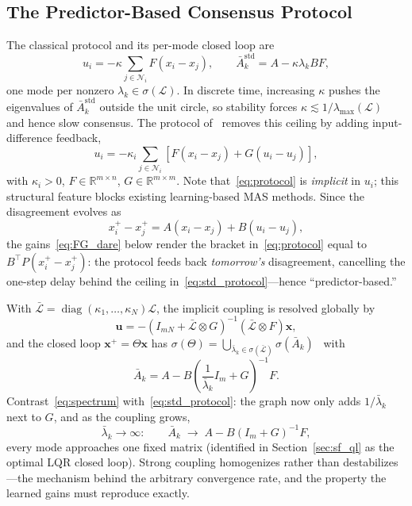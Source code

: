 \documentclass[final,5p,times]{elsarticle}
\theoremstyle{plain}
\theoremstyle{definition}
\theoremstyle{remark}
\DeclareMathOperator{\diag}{diag}
\newcommand{\R}{\mathbb{R}}
\newcommand{\bx}{\boldsymbol{x}}
\newcommand{\bu}{\boldsymbol{u}}
\begin{document}
\subsection{The Predictor-Based Consensus Protocol}
\label{subsec:protocol}
The classical protocol and its per-mode closed loop are
\begin{equation}
u_i = -\kappa \!\sum_{j \in \mathcal{N}_i}\! F(x_i - x_j), \qquad
\bar{A}_k^{\mathrm{std}} = A - \kappa\lambda_k BF,
\label{eq:std_protocol}
\end{equation}
one mode per nonzero $\lambda_k \in \sigma(\mathcal{L})$. In discrete time, increasing $\kappa$ pushes the eigenvalues of $\bar{A}_k^{\mathrm{std}}$ outside the unit circle, so stability forces $\kappa \lesssim 1/\lambda_{\max}(\mathcal{L})$~\cite{ma2015,xiao2004} and hence slow consensus. The protocol of~\cite{cacace2024} removes this ceiling by adding input-difference feedback,
\begin{equation}
u_i = -\kappa_i \sum_{j \in \mathcal{N}_i} \left[ F(x_i - x_j) + G(u_i - u_j) \right],
\label{eq:protocol}
\end{equation}
with $\kappa_i > 0$, $F \in \R^{m \times n}$, $G \in \R^{m \times m}$. Note that~\eqref{eq:protocol} is \emph{implicit} in $u_i$; this structural feature blocks existing learning-based MAS methods. Since the disagreement evolves as
\begin{equation}
x_i^+ - x_j^+ = A(x_i - x_j) + B(u_i - u_j),
\label{eq:predictor_interp}
\end{equation}
the gains~\eqref{eq:FG_dare} below render the bracket in~\eqref{eq:protocol} equal to $B^\top P(x_i^+ - x_j^+)$: the protocol feeds back \emph{tomorrow's} disagreement, cancelling the one-step delay behind the ceiling in~\eqref{eq:std_protocol}---hence ``predictor-based.''

With $\bar{\mathcal{L}} = \diag(\kappa_1,\ldots,\kappa_N)\mathcal{L}$, the implicit coupling is resolved globally by
\begin{equation}
\bu = -(I_{mN} + \bar{\mathcal{L}} \otimes G)^{-1}(\bar{\mathcal{L}} \otimes F)\bx,
\label{eq:u_central}
\end{equation}
and the closed loop $\bx^+ = \Theta\bx$ has $\sigma(\Theta) = \bigcup_{\bar{\lambda}_k \in \sigma(\bar{\mathcal{L}})} \sigma(\bar{A}_k)$~\cite[Lemma~3.1]{cacace2024} with
\begin{equation}
\bar{A}_k = A - B\left(\frac{1}{\bar{\lambda}_k}I_m + G\right)^{-1}F.
\label{eq:spectrum}
\end{equation}
Contrast~\eqref{eq:spectrum} with~\eqref{eq:std_protocol}: the graph now only adds $1/\bar{\lambda}_k$ next to $G$, and as the coupling grows,
\begin{equation}
\bar{\lambda}_k \to \infty: \qquad \bar{A}_k \;\longrightarrow\; A - B(I_m + G)^{-1}F,
\label{eq:limit}
\end{equation}
every mode approaches one fixed matrix (identified in Section~\ref{sec:sf_ql} as the optimal LQR closed loop). Strong coupling homogenizes rather than destabilizes---the mechanism behind the arbitrary convergence rate, and the property the learned gains must reproduce exactly.
\end{document}
